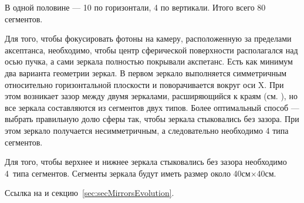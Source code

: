 

В одной половине --- 10 по горизонтали, 4 по вертикали. Итого всего 80 сегментов.

Для того, чтобы фокусировать фотоны на камеру, расположенную за пределами аксептанса, необходимо, чтобы центр сферической поверхности располагался над осью пучка, а сами зеркала полностью покрывали акспетанс. Есть как минимум два варианта геометрии зеркал. В первом зеркало выполняется симметричным относительно горизонтальной плоскости и поворачивается вокруг оси X. При этом возникает зазор между двумя зеркалами, расширяющийся к краям (см. \figref{}), но все зеркала составляются из сегментов двух типов. Более оптимальный способ --- выбрать правильную долю сферы так, чтобы зеркала стыковались без зазора. При этом зеркало получается несимметричным, а следовательно необходимо 4 типа сегментов.

Для того, чтобы верхнее и нижнее зеркала стыковались без зазора необходимо 4~типа сегментов. Сегменты зеркала будут иметь размер около 40см$\times$40см.

Ссылка на  и секцию~\ref{sec:secMirrorsEvolution}.



